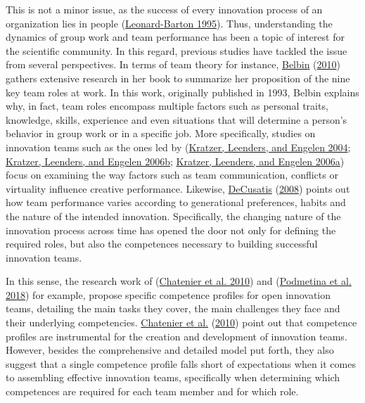 \documentclass[AMA,STIX1COL,APA,STIX2COL]{WileyNJD-v2}
\begin{document}
This is not a minor issue, as the success of every innovation process of
an organization lies in people
(\protect\hyperlink{ref-Leonard1995}{Leonard-Barton 1995}). Thus,
understanding the dynamics of group work and team performance has been a
topic of interest for the scientific community. In this regard, previous
studies have tackled the issue from several perspectives. In terms of
team theory for instance, \protect\hyperlink{ref-Belbin2010}{Belbin}
(\protect\hyperlink{ref-Belbin2010}{2010}) gathers extensive research in
her book to summarize her proposition of the nine key team roles at
work. In this work, originally published in 1993, Belbin explains why,
in fact, team roles encompass multiple factors such as personal traits,
knowledge, skills, experience and even situations that will determine a
person's behavior in group work or in a specific job. More specifically,
studies on innovation teams such as the ones led by
(\protect\hyperlink{ref-Kratzer2004}{Kratzer, Leenders, and Engelen
2004}; \protect\hyperlink{ref-Kratzer2006-A}{Kratzer, Leenders, and
Engelen 2006b}; \protect\hyperlink{ref-Kratzer2006-B}{Kratzer, Leenders,
and Engelen 2006a}) focus on examining the way factors such as team
communication, conflicts or virtuality influence creative performance.
Likewise, \protect\hyperlink{ref-DeCusatis2008}{DeCusatis}
(\protect\hyperlink{ref-DeCusatis2008}{2008}) points out how team
performance varies according to generational preferences, habits and the
nature of the intended innovation. Specifically, the changing nature of
the innovation process across time has opened the door not only for
defining the required roles, but also the competences necessary to
building successful innovation teams.

In this sense, the research work of
(\protect\hyperlink{ref-Chatenier2010}{Chatenier et al. 2010}) and
(\protect\hyperlink{ref-Podmetina2018}{Podmetina et al. 2018}) for
example, propose specific competence profiles for open innovation teams,
detailing the main tasks they cover, the main challenges they face and
their underlying competencies.
\protect\hyperlink{ref-Chatenier2010}{Chatenier et al.}
(\protect\hyperlink{ref-Chatenier2010}{2010}) point out that competence
profiles are instrumental for the creation and development of innovation
teams. However, besides the comprehensive and detailed model put forth,
they also suggest that a single competence profile falls short of
expectations when it comes to assembling effective innovation teams,
specifically when determining which competences are required for each
team member and for which role.
\end{document}
